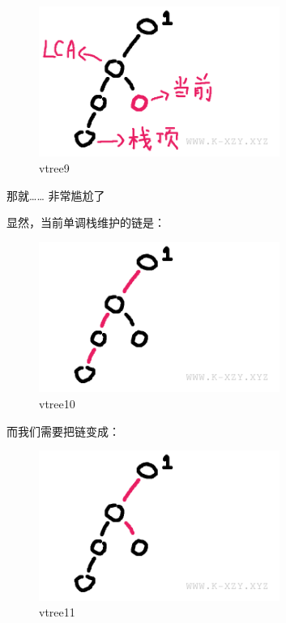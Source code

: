 \begin{figure}[htbp]
\centering
\includegraphics[width=0.7\textwidth]{docs/ds/images/vtree9.png} 
\caption{vtree9}
\end{figure}

那就…… 非常尴尬了

显然，当前单调栈维护的链是：

\begin{figure}[htbp]
\centering
\includegraphics[width=0.7\textwidth]{docs/ds/images/vtree10.png} 
\caption{vtree10}
\end{figure}

而我们需要把链变成：

\begin{figure}[htbp]
\centering
\includegraphics[width=0.7\textwidth]{docs/ds/images/vtree11.png} 
\caption{vtree11}
\end{figure}

